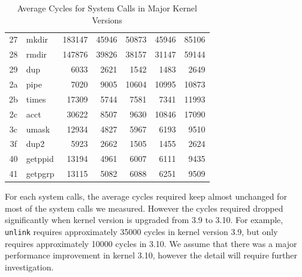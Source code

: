 \documentclass{article}
\begin{document}
\begin{table}
\begin{tabular}{clrrrrr}
        27 & mkdir & 183147 & 45946 & 50873 & 45946 & 85106 \\
        28 & rmdir & 147876 & 39826 & 38157 & 31147 & 59144 \\
        29 & dup & 6033 & 2621 & 1542 & 1483 & 2649 \\
        2a & pipe & 7020 & 9005 & 10604 & 10995 & 10873 \\
        2b & times & 17309 & 5744 & 7581 & 7341 & 11993 \\
        2c & acct & 30622 & 8507 & 9630 & 10846 & 17090 \\
        3c & umask & 12934 & 4827 & 5967 & 6193 & 9510 \\
        3f & dup2 & 5923 & 2662 & 1505 & 1455 & 2624 \\
        40 & getppid & 13194 & 4961 & 6007 & 6111 & 9435 \\
        41 & getpgrp & 13115 & 5082 & 6088 & 6251 & 9509 \\
        \bottomrule
    \end{tabular}
    \caption{\label{tab:mean} Average Cycles for System Calls in Major Kernel Versions}
\end{table}


For each system calls, the average cycles required keep almost unchanged for most of the system calls we measured.
However the cycles required dropped significantly when kernel version is upgraded from 3.9 to 3.10.
For example, \lstinline{unlink} requires approximately 35000 cycles in kernel version 3.9, but
only requires approximately 10000 cycles in 3.10. We assume that there was a major performance improvement in kernel 3.10,
however the detail will require further investigation.
\end{document}

